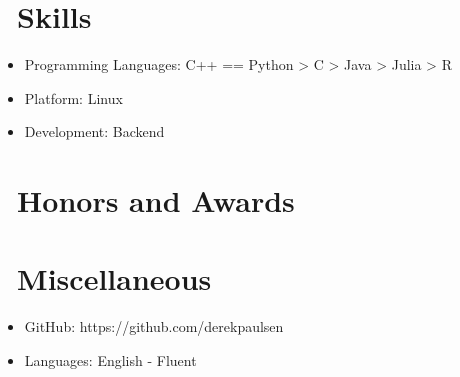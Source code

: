 \documentclass{resume}
\begin{document}

\section{\faCogs\ Skills}
\begin{itemize}[parsep=0.5ex]
  \item Programming Languages: C++ == Python > C > Java > Julia > R
  \item Platform: Linux
  \item Development: Backend
\end{itemize}

\section{\faHeartO\ Honors and Awards}

\section{\faInfo\ Miscellaneous}
\begin{itemize}[parsep=0.5ex]
  \item GitHub: https://github.com/derekpaulsen
  \item Languages: English - Fluent
\end{itemize}

%
%
\end{document}
